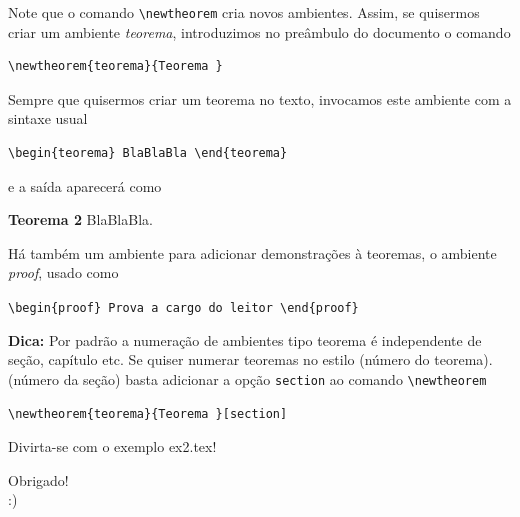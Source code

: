 \documentclass[12pt]{beamer}
\begin{document}
\begin{frame}[fragile]
  Note que o comando \verb+\newtheorem+ cria novos ambientes. Assim, se quisermos criar um ambiente \textit{teorema}, introduzimos no preâmbulo do documento o comando

  \begin{verbatim} 
\newtheorem{teorema}{Teorema }
  \end{verbatim}
  Sempre que quisermos criar um teorema no texto, invocamos este ambiente com a sintaxe usual
   
  \begin{verbatim} 
\begin{teorema} BlaBlaBla \end{teorema}
  \end{verbatim}
  e a saída aparecerá como 
  
  \bigskip  
  \textbf{Teorema 2} BlaBlaBla.

\end{frame}

\begin{frame}[fragile]
  Há também um ambiente para adicionar demonstrações à teoremas, o ambiente \textit{proof}, usado como
  
  \verb+\begin{proof} Prova a cargo do leitor \end{proof}+
  
  \bigskip
  
  \textbf{Dica: } Por padrão a numeração de ambientes tipo teorema é independente de seção, capítulo etc. Se quiser numerar teoremas no estilo (número do teorema).(número da seção) basta adicionar a opção \verb+section+ ao comando \verb+\newtheorem+

  \begin{verbatim} 
\newtheorem{teorema}{Teorema }[section] 
  \end{verbatim}
  
  Divirta-se com o exemplo ex2.tex!

\end{frame}

\begin{frame}
  \begin{center}
    \large Obrigado!\\
    :)
  \end{center}
\end{frame}
\end{document}
